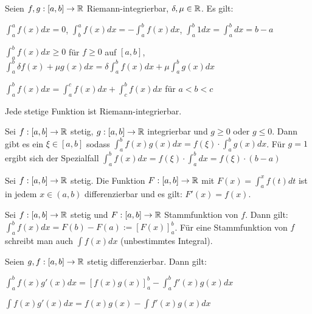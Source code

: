 \begin{satz}
	Seien $f,g : [a,b] \rightarrow \mathbb{R}$ Riemann-integrierbar, $\delta, \mu \in \mathbb{R}$. Es gilt:
	\begin{description}[noitemsep]
		\item $\int_{a}^{a} f(x) dx = 0$, $\int_{b}^{a} f(x) dx = - \int_{a}^{b} f(x) dx$, $\int_{a}^{b} 1 dx = \int_{a}^{b} dx = b - a$
		\item $\int_{a}^{b} f(x) dx \geq 0$ für $f \geq 0$ auf $[a,b]$, $\int_{a}^{b} \delta f(x) + \mu g(x) dx = \delta \int_{a}^{b}f(x) dx + \mu \int_{a}^{b} g(x) dx$
		\item $\int_{a}^{b} f(x) dx = \int_{a}^{c} f(x) dx + \int_{c}^{b} f(x) dx$ für $a < b < c$
	\end{description} 
\end{satz}

\begin{satz}
	Jede stetige Funktion ist Riemann-integrierbar.
\end{satz}

\begin{satz}
	Sei $f : [a,b] \rightarrow \mathbb{R}$ stetig, $g : [a,b] \rightarrow \mathbb{R}$ integrierbar und $g \geq 0$ oder $g \leq 0$. Dann gibt es ein $\xi \in [a,b]$ sodass $\int_{a}^{b}f(x)g(x) dx = f(\xi) \cdot \int_{a}^{b} g(x) dx$. Für $g=1$ ergibt sich der Spezialfall $\int_{a}^{b}f(x)dx = f(\xi) \cdot \int_{a}^{b} dx = f(\xi) \cdot (b - a)$
\end{satz}

\begin{satz}
	Sei $f : [a,b] \rightarrow \mathbb{R}$ stetig. Die Funktion $F : [a,b] \rightarrow \mathbb{R}$ mit $F(x) = \int_{a}^{x} f(t) dt$ ist in jedem $x \in (a,b)$ differenzierbar und es gilt: $F'(x) = f(x)$.
\end{satz}

\begin{satz}
	Sei $f : [a,b] \rightarrow \mathbb{R}$ stetig und $F : [a,b] \rightarrow \mathbb{R}$ Stammfunktion von $f$. Dann gilt: $\int_{a}^{b}f(x)dx = F(b) - F(a) := [F(x)]_a^b$. Für eine Stammfunktion von $f$ schreibt man auch $\int f(x) dx$ (unbestimmtes Integral).
\end{satz}

\begin{satz}
	Seien $g,f : [a,b] \rightarrow \mathbb{R}$ stetig differenzierbar. Dann gilt:
	\begin{description}[noitemsep]
		\item $\int_{a}^{b} f(x)g'(x)dx = [f(x)g(x)]_a^b - \int_{a}^{b} f'(x)g(x)dx$
		\item $\int f(x)g'(x)dx = f(x)g(x) - \int f'(x)g(x)dx$	
	\end{description}
\end{satz}


